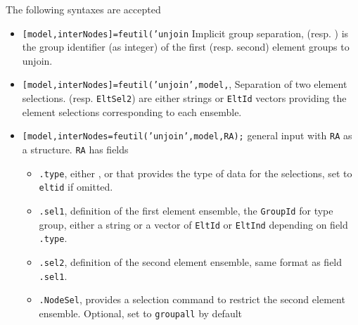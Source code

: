 The following syntaxes are accepted
\begin{itemize}
\item {\tt [model,interNodes]=feutil('unjoin}  Implicit group separation,  (resp. ) is the group identifier (as integer) of the first (resp. second) element groups to unjoin.
\item {\tt [model,interNodes]=feutil('unjoin',model,}, Separation of two element selections.  (resp. {\tt EltSel2}) are either  strings or {\tt EltId} vectors providing the element selections corresponding to each ensemble.
\item {\tt [model,interNodes=feutil('unjoin',model,RA);} general input with {\tt RA} as a structure. {\tt RA} has fields
\begin{itemize}
\item {\tt .type}, either ,  or  that provides the type of data for the selections, set to {\tt eltid} if omitted.
\item {\tt .sel1}, definition of the first element ensemble, the {\tt GroupId} for type group, either a  string or a vector of {\tt EltId} or {\tt EltInd} depending on field {\tt .type}.
\item {\tt .sel2},  definition of the second element ensemble, same format as field {\tt .sel1}.
\item {\tt .NodeSel}, provides a  selection command to restrict the second element ensemble. Optional, set to {\tt groupall} by default
\end{itemize}
\end{itemize}



